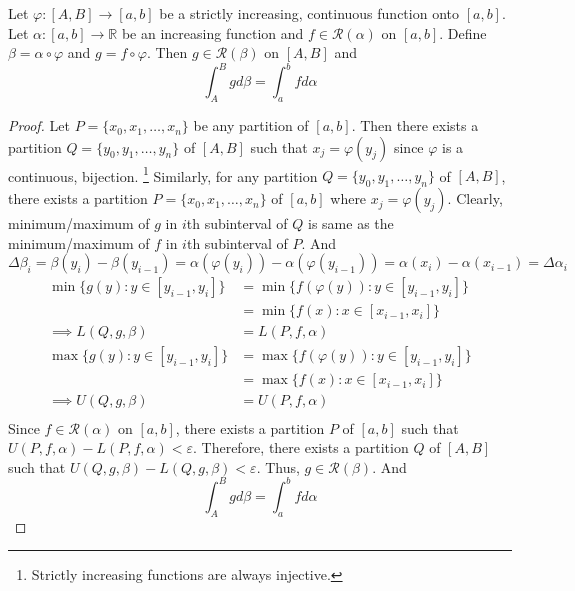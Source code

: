 \begin{theorem}
	Let $\varphi : [A,B] \to [a,b]$ be a strictly increasing, continuous function onto $[a,b]$.
	Let $\alpha : [a,b] \to \mathbb{R}$ be an increasing function and $f \in \mathscr{R}(\alpha)$ on $[a,b]$.
	Define $\beta = \alpha \circ \varphi$ and $g = f \circ \varphi$.
	Then $g \in \mathscr{R}(\beta)$ on $[A,B]$ and 
	\[ \int_A^B g d\beta = \int_a^b f d\alpha \]
\end{theorem}
\begin{proof}
	Let $P = \{x_0,x_1,\dots,x_n\}$ be any partition of $[a,b]$.
	Then there exists a partition $Q = \{ y_0,y_1,\dots,y_n\}$ of $[A,B]$ such that $x_j = \varphi(y_j)$ since $\varphi$ is a continuous, bijection.
	\dag\footnote{Strictly increasing functions are always injective.}
	Similarly, for any partition $Q = \{ y_0,y_1,\dots,y_n\}$ of $[A,B]$, there exists a partition $P = \{ x_0,x_1,\dots,x_n\}$ of $[a,b]$ where $x_j= \varphi(y_j)$.
	Clearly, minimum/maximum of $g$ in $i$th subinterval of $Q$ is same as the minimum/maximum of $f$ in $i$th subinterval of $P$.
	And 
	\[ \Delta \beta_i = \beta(y_i) - \beta(y_{i-1}) = \alpha(\varphi(y_i)) - \alpha(\varphi(y_{i-1})) = \alpha(x_i) - \alpha(x_{i-1}) = \Delta \alpha_i \]
	\begin{align*}
	\min \{ g(y) : y \in [y_{i-1},y_i] \}
		& = \min \{ f(\varphi(y)) : y \in [y_{i-1},y_i] \} \\
		& = \min \{ f(x) : x \in [x_{i-1},x_i] \} \\
	\implies L(Q,g,\beta) 
		& = L(P,f,\alpha) \\
	\max \{ g(y) : y \in [y_{i-1},y_i] \}
		& = \max \{ f(\varphi(y)) : y \in [y_{i-1},y_i] \} \\
		& = \max \{ f(x) : x \in [x_{i-1},x_i] \} \\
		\implies U(Q,g,\beta) & = U(P,f,\alpha) \\
	\end{align*}
	Since $f \in \mathscr{R}(\alpha)$ on $[a,b]$, there exists a partition $P$ of $[a,b]$ such that $U(P,f,\alpha) - L(P,f,\alpha) < \varepsilon$.
	Therefore, there exists a partition $Q$ of $[A,B]$ such that $U(Q,g,\beta) - L(Q,g,\beta) < \varepsilon$.
	Thus, $g \in \mathscr{R}(\beta)$.
	And
	\[ \int_A^B g d\beta = \int_a^b f d\alpha \]
\end{proof}

